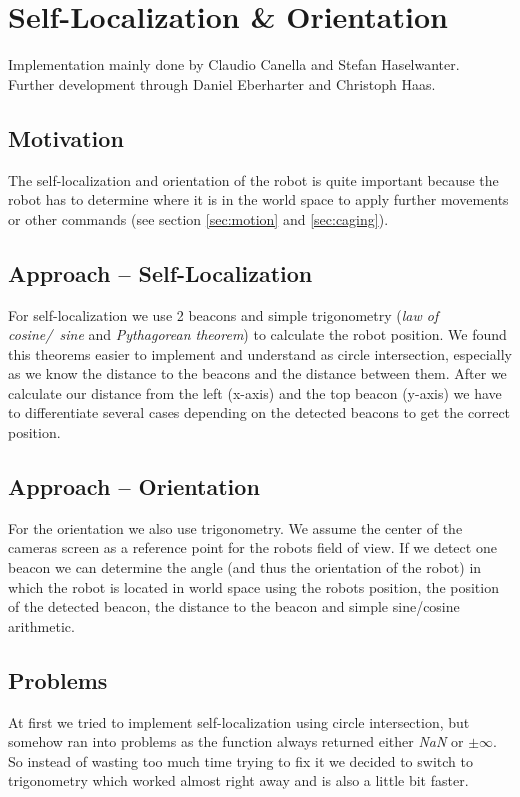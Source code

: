\documentclass[703031]{iisreport}
\begin{document}
\section{Self-Localization \& Orientation}
\label{sec:localization}
Implementation mainly done by Claudio Canella and Stefan Haselwanter. \\
Further development through Daniel Eberharter and Christoph Haas.

\subsection{Motivation}
The self-localization and orientation of the robot is quite important because the robot has to determine where it is in the world space to apply further movements or other commands (see section \ref{sec:motion} and \ref{sec:caging}).

\subsection{Approach -- Self-Localization}
For self-localization we use 2 beacons and simple trigonometry (\emph{law of \mbox{cosine}/\ sine} and \emph{Pythagorean theorem}) to calculate the robot position. We found this theorems easier to implement and understand as circle intersection, especially as we know the distance to the beacons and the distance between them. After we calculate our distance from the left (x-axis) and the top beacon (y-axis) we have to differentiate several cases depending on the detected beacons to get the correct position.

\subsection{Approach -- Orientation}
For the orientation we also use trigonometry. We assume the center of the cameras screen as a reference point for the robots field of view. If we detect one beacon we can determine the angle (and thus the orientation of the robot) in which the robot is located in world space using the robots position, the position of the detected beacon, the distance to the beacon and simple sine/cosine arithmetic.

\subsection{Problems}
At first we tried to implement self-localization using circle intersection, but somehow ran into problems as the function always returned either \emph{NaN} or $\pm \infty$. So instead of wasting too much time trying to fix it we decided to switch to trigonometry which worked almost right away and is also a little bit faster.
\end{document}
